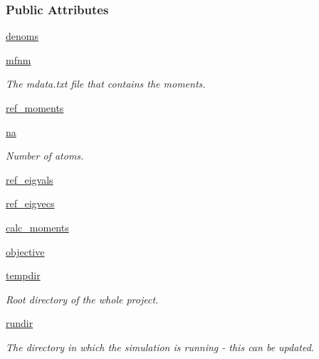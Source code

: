 \subsubsection*{Public Attributes}
\begin{DoxyCompactItemize}
\item 
\hyperlink{classforcebalance_1_1moments_1_1Moments_af8711c91b434e0c8a54a6e4c96e58f3b}{denoms}
\item 
\hyperlink{classforcebalance_1_1moments_1_1Moments_ab9cf14ace681ac05db60b368b7726311}{mfnm}
\begin{DoxyCompactList}\small\item\em The mdata.\-txt file that contains the moments. \end{DoxyCompactList}\item 
\hyperlink{classforcebalance_1_1moments_1_1Moments_a482e5ec495c5466d32de15a97758a63c}{ref\-\_\-moments}
\item 
\hyperlink{classforcebalance_1_1moments_1_1Moments_ab04edfe986c2fc46d11af156d76a7b2f}{na}
\begin{DoxyCompactList}\small\item\em Number of atoms. \end{DoxyCompactList}\item 
\hyperlink{classforcebalance_1_1moments_1_1Moments_ada9ac5bee6884a031f7db7ad00331649}{ref\-\_\-eigvals}
\item 
\hyperlink{classforcebalance_1_1moments_1_1Moments_ad0da4538b3e3fe86eba5c326ccebd7a6}{ref\-\_\-eigvecs}
\item 
\hyperlink{classforcebalance_1_1moments_1_1Moments_a0b71c05c5ddbea8f0990879abd604aec}{calc\-\_\-moments}
\item 
\hyperlink{classforcebalance_1_1moments_1_1Moments_aa90c357e8ee9f18bb9db99688bbeb227}{objective}
\item 
\hyperlink{classforcebalance_1_1target_1_1Target_aa1f01b5b78db253b5b66384ed11ed193}{tempdir}
\begin{DoxyCompactList}\small\item\em Root directory of the whole project. \end{DoxyCompactList}\item 
\hyperlink{classforcebalance_1_1target_1_1Target_a6872de5b2d4273b82336ea5b0da29c9e}{rundir}
\begin{DoxyCompactList}\small\item\em The directory in which the simulation is running -\/ this can be updated. \end{DoxyCompactList}\item 

\end{DoxyCompactItemize}
